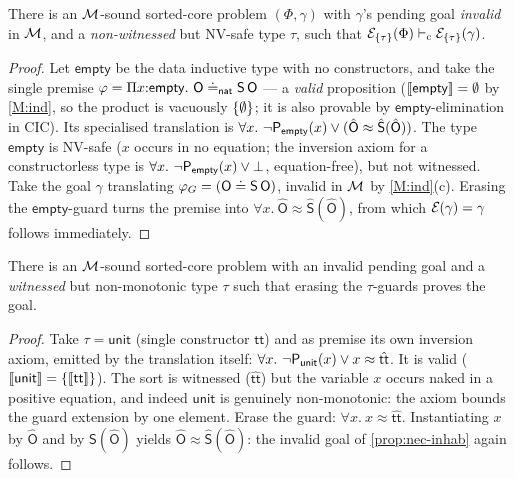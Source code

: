\begin{proposition}
\label{prop:nec-inhab}
There is an $\mathcal{M}$-sound sorted-core problem $(\Phi, \gamma)$ with
$\gamma$'s pending goal \emph{invalid} in $\mathcal{M}$, and a
\emph{non-witnessed} but NV-safe type $\tau$, such that
$\mathcal{E}_{\{\tau\}}(\Phi) \vdash_{\mathrm{c}} \mathcal{E}_{\{\tau\}}(\gamma)$.
\end{proposition}

\begin{proof}
Let $\mathsf{empty}$ be the data inductive type with no
constructors, and take the single premise $\varphi = \Pi
x{:}\mathsf{empty}.\ \mathsf{O} \doteq_{\mathsf{nat}}
\mathsf{S}\,\mathsf{O}$ --- a \emph{valid} proposition
($[\![ \mathsf{empty} ]\!] = \emptyset$ by \ref{M:ind}, so the product
is vacuously $\{\emptyset\}$; it is also provable by
$\mathsf{empty}$-elimination in CIC).  Its specialised translation
is $\forall x.\ \neg\mathsf{P}_{\mathsf{empty}}(x) \vee
(\hat{\mathsf{O}} \approx \hat{\mathsf{S}}(\hat{\mathsf{O}}))$.
The type $\mathsf{empty}$ is NV-safe ($x$ occurs in no equation;
the inversion axiom for a constructorless type is $\forall x.\
\neg\mathsf{P}_{\mathsf{empty}}(x) \vee \bot$, equation-free), but not
witnessed.  Take the goal $\gamma$ translating $\varphi_G =
(\mathsf{O} \doteq \mathsf{S}\,\mathsf{O})$, invalid in $\mathcal{M}$ by
\ref{M:ind}(c).  Erasing the $\mathsf{empty}$-guard turns the
premise into $\forall x.\ \hat{\mathsf{O}} \approx
\hat{\mathsf{S}}(\hat{\mathsf{O}})$, from which
$\mathcal{E}_{}(\gamma) = \gamma$ follows immediately.
\end{proof}

\begin{proposition}
\label{prop:nec-mono}
There is an $\mathcal{M}$-sound sorted-core problem with an invalid pending
goal and a \emph{witnessed} but non-monotonic type $\tau$ such that
erasing the $\tau$-guards proves the goal.
\end{proposition}

\begin{proof}
Take $\tau = \mathsf{unit}$ (single constructor $\mathsf{tt}$) and
as premise its own inversion axiom, emitted by the translation
itself: $\forall x.\ \neg\guard{\mathsf{unit}}(x) \vee x \approx
\hat{\mathsf{tt}}$.  It is valid ($[\![ \mathsf{unit} ]\!] =
\{[\![ \mathsf{tt} ]\!]\}$).  The sort is witnessed
($\hat{\mathsf{tt}}$) but the variable $x$ occurs naked in a
positive equation, and indeed $\mathsf{unit}$ is genuinely
non-monotonic: the axiom bounds the guard extension by one element.
Erase the guard: $\forall x.\ x \approx \hat{\mathsf{tt}}$.
Instantiating $x$ by $\hat{\mathsf{O}}$ and by
$\hat{\mathsf{S}}(\hat{\mathsf{O}})$ yields $\hat{\mathsf{O}}
\approx \hat{\mathsf{S}}(\hat{\mathsf{O}})$: the invalid goal of
\cref{prop:nec-inhab} again follows.
\end{proof}

